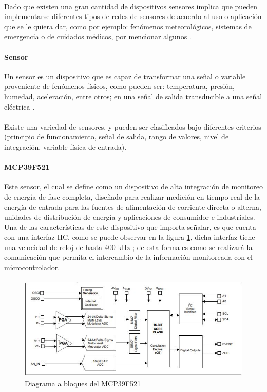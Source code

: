 \paragraph{}
Dado que existen una gran cantidad de dispositivos sensores implica que pueden implementarse diferentes tipos de redes de sensores de acuerdo al uso o aplicación que se le quiera dar, como por ejemplo: fenómenos meteorológicos, sistemas de emergencia o de cuidados médicos, por mencionar algunos \citep{MarcoTeorico16}.

\paragraph{Sensor}
Un sensor es un dispositivo que es capaz de transformar una señal o variable proveniente de fenómenos físicos, como pueden ser: temperatura, presión, humedad, aceleración, entre otros; en una señal de salida transducible a una señal eléctrica \citep{MarcoTeorico20} .
\paragraph{}
Existe una variedad de sensores, y pueden ser clasificados bajo diferentes criterios (principio de funcionamiento, señal de salida, rango de valores, nivel de integración, variable física de entrada).

\paragraph{MCP39F521}
Este sensor, el cual se define como un dispositivo de alta integración de monitoreo de energía de fase completa, diseñado para realizar medición en tiempo real de la energía de entrada para las fuentes de alimentación de corriente directa o alterna, unidades de distribución de energía y aplicaciones de consumidor e industriales. Una de las características de este dispositivo que importa señalar, es que cuenta con una interfaz IIC, como se puede observar en la figura \ref{fig:Diagrama a bloques del MCP39F521}, dicha interfaz tiene una velocidad de reloj de hasta 400 kHz \citep{MarcoTeorico13}; de esta forma es como se realizará la comunicación que permita el intercambio de la información monitoreada con el microcontrolador. 
\paragraph{}
\begin{figure}[H]
	\centering
	\includegraphics[scale=.9]{Capitulo2/images/DiagramaDispMonitoreo.JPG}
	\caption{Diagrama a bloques del MCP39F521}
	\label{fig:Diagrama a bloques del MCP39F521}
\end{figure}

